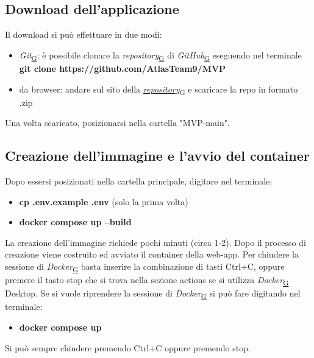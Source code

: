 \documentclass[a4paper,12pt]{article}
\begin{document}
        \subsection{Download dell'applicazione}
        Il download si può effettuare in due modi:
        \begin{itemize}
        \item \textit{Git}\textsubscript{\href{https://atlasteam9.github.io/Atlas/glossario.html\#Git}{G}}: è possibile clonare la \textit{repository}\textsubscript{\href{https://atlasteam9.github.io/Atlas/glossario.html\#Repository}{G}} di \textit{GitHub}\textsubscript{\href{https://atlasteam9.github.io/Atlas/glossario.html\#GitHub}{G}} eseguendo nel terminale \newline \textbf{git clone https://github.com/AtlasTeam9/MVP}
        \item da browser: andare sul sito della \href{https://github.com/AtlasTeam9/MVP}{\textit{repository}\textsubscript{\href{https://atlasteam9.github.io/Atlas/glossario.html\#Repository}{G}}} e scaricare la repo in formato .zip
        \end{itemize}
        Una volta scaricato, posizionarsi nella cartella "MVP-main".

        \subsection{Creazione dell'immagine e l'avvio del container}
        Dopo essersi posizionati nella cartella principale, digitare nel terminale: 
        \begin{itemize}
          \item \textbf{cp .env.example .env} (solo la prima volta)
          \item \textbf{docker compose up --build}
        \end{itemize}
        La creazione dell'immagine richiede pochi minuti (circa 1-2). Dopo il processo di creazione viene costruito ed avviato il container della web-app. Per chiudere la sessione di \textit{Docker}\textsubscript{\href{https://atlasteam9.github.io/Atlas/glossario.html\#Docker}{G}} basta inserire la combinazione di tasti Ctrl+C, oppure premere il tasto stop che si trova nella sezione actions se si utilizza \textit{Docker}\textsubscript{\href{https://atlasteam9.github.io/Atlas/glossario.html\#Docker}{G}} Desktop. \newline Se si vuole riprendere la sessione di \textit{Docker}\textsubscript{\href{https://atlasteam9.github.io/Atlas/glossario.html\#Docker}{G}} si può fare digitando nel terminale:
        \begin{itemize}
          \item \textbf{docker compose up} 
        \end{itemize}
        Si può sempre chiudere premendo Ctrl+C oppure premendo stop.
        
\end{document}
